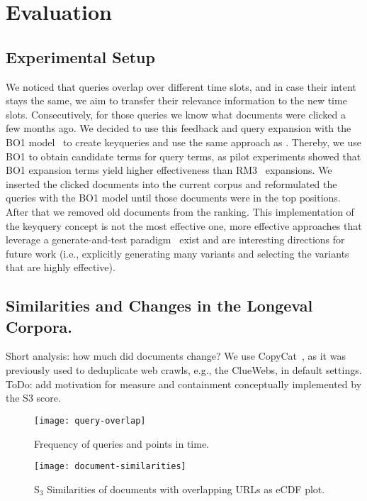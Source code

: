 \section{Evaluation}

\subsection{Experimental Setup}


We noticed that queries overlap over different time slots, and in case their intent stays the same, we aim to transfer their relevance information to the new time slots. Consecutively, for those queries we know what documents were clicked a few months ago. We decided to use this feedback and query expansion with the BO1 model~\cite{amati:2003} to create keyqueries and use the same approach as \cite{froebe-mis:2022}. Thereby, we use BO1 to obtain candidate terms for query terms, as pilot experiments showed that BO1 expansion terms yield higher effectiveness than RM3~\cite{jaleel:2004} expansions. We inserted the clicked documents into the current corpus and reformulated the queries with the BO1 model until those documents were in the top positions. After that we removed old documents from the ranking. This implementation of the keyquery concept is not the most effective one, more effective approaches that leverage a generate-and-test paradigm~\cite{froebe:2021c} exist and are interesting directions for future work (i.e., explicitly generating many variants and selecting the variants that are highly effective).


\subsection{Similarities and Changes in the Longeval Corpora.}

Short analysis: how much did documents change? We use CopyCat~\cite{froebe:2021a}, as it was previously used to deduplicate web crawls, e.g., the ClueWebs, in default settings. ToDo: add motivation for measure and containment conceptually implemented by the S3 score.

\begin{figure}[t]
    \begin{minipage}{.49\textwidth}
        \texttt{[image: query-overlap]}
        \vspace{-4ex}
        \caption{Frequency of queries and points in time.}
        \label{fig:query-overlap}
    \end{minipage}
    \hfill    
    \begin{minipage}{.49\textwidth}
        \texttt{[image: document-similarities]}
        \vspace{-4ex}
        \caption{S$_{3}$ Similarities of documents with overlapping URLs as eCDF plot.}
        \label{fig:document-similarities}
    \end{minipage}
\end{figure}

